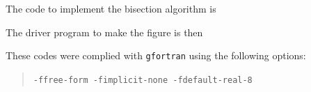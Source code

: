 \documentclass[11pt]{article}
\begin{document}
The code to implement the bisection algorithm is

The driver program to make the figure is then

These codes were complied with \verb|gfortran| using the following options:
\begin{quote}
\verb|-ffree-form -fimplicit-none -fdefault-real-8|
\end{quote}
\end{document}
